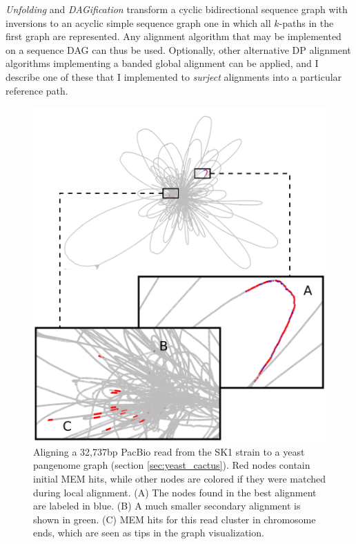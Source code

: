 \documentclass[a4paper,12pt,numbered,oneside]{Classes/PhDThesisPSnPDF}
\begin{document}
\emph{Unfolding} and \emph{DAGification} transform a cyclic bidirectional sequence graph with inversions to an acyclic simple sequence graph one in which all $k$-paths in the first graph are represented.
Any alignment algorithm that may be implemented on a sequence DAG can thus be used.
Optionally, other alternative DP alignment algorithms implementing a banded global alignment can be applied, and I describe one of these that I implemented to \emph{surject} alignments into a particular reference path.

\begin{figure}[htbp!]
\centering
\includegraphics[width=1.0\textwidth]{Chapter2/Figs/mapping_cactus_pacbio_aln_vizzy.pdf}
\caption[Alignment of a PacBio read to a yeast pangenome]{
  Aligning a 32,737bp PacBio read from the SK1 strain to a yeast pangenome graph (section \ref{sec:yeast_cactus}).
  Red nodes contain initial MEM hits, while other nodes are colored if they were matched during local alignment.
  (A) The nodes found in the best alignment are labeled in blue.
  (B) A much smaller secondary alignment is shown in green.
  (C) MEM hits for this read cluster in chromosome ends, which are seen as tips in the graph visualization.
}
\label{fig:alignment_to_cactus_yeast}
\end{figure}
\end{document}
